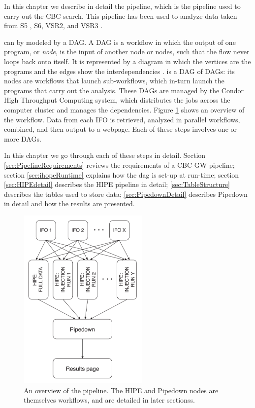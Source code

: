 
\def\12to18{Abbott:2009qj}
\def\sfive1yr{Collaboration:2009tt}
\def\sfivelvc{S5LowMassLV}


In this chapter we describe in detail the \ihope pipeline, which is the pipeline
used to carry out the \ac{CBC} search. This pipeline has been used to analyze
data taken from \ac{S5} \cite{\sfive1yr,\12to18}, \ac{S6}, \ac{VSR2}, and
\ac{VSR3} \cite{s6paper}.

\ihope can by modeled by a \ac{DAG}. A \ac{DAG} is a workflow in which the
output of one program, or {\it node}, is the input of another node or nodes,
such that the flow never loops back onto itself. It is represented by a diagram
in which the vertices are the programs and the edges show the interdependencies
\cite{condor}. \ihope is a \ac{DAG} of \ac{DAG}s: its nodes are workflows that
launch sub-workflows, which in-turn launch the programs that carry out the
analysis. These \ac{DAG}s are managed by the Condor High Throughput Computing
system, which distributes the jobs across the computer cluster and manages the
dependencies. Figure \ref{fig:ihopeOverview} shows an overview of the \ihope
workflow. Data from each \ac{IFO} is retrieved, analyzed in parallel workflows,
combined, and then output to a webpage. Each of these steps involves one or
more \ac{DAG}s.

In this chapter we go through each of these steps in detail. Section
\ref{sec:PipelineRequirements} reviews the requirements of a \ac{CBC} \ac{GW}
pipeline; section \ref{sec:ihopeRuntime} explains how the dag is set-up at
run-time; section \ref{sec:HIPEdetail} describes the HIPE pipeline in detail;
\ref{sec:TableStructure} describes the tables used to store data;
\ref{sec:PipedownDetail} describes Pipedown in detail and how the results are
presented. 

\begin{figure}[h]
\begin{center}
\includegraphics[width=2.5in]{figures/ihopeOverview.pdf}
\end{center}
\caption{
An overview of the \ihope pipeline. The HIPE and Pipedown nodes are themselves workflows, and are detailed in later sectionss.
}
\label{fig:ihopeOverview}
\end{figure}

